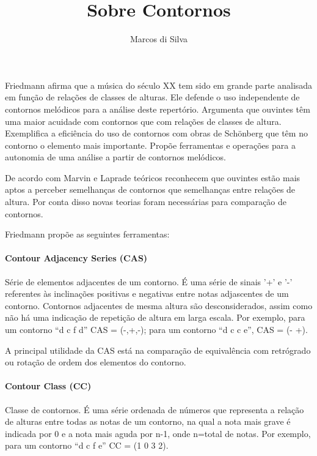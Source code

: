 \documentclass{article}
\title{Sobre Contornos}
\author{Marcos di Silva}
\begin{document}
\setlength{\parindent}{0cm}
\maketitle
\thispagestyle{empty}

Friedmann \cite{friedmann85:_method_discus_contour} afirma que a
música do século XX tem sido em grande parte analisada em função de
relações de classes de alturas. Ele defende o uso independente de
contornos melódicos para a análise deste repertório. Argumenta que
ouvintes têm uma maior acuidade com contornos que com relações de
classes de altura. Exemplifica a eficiência do uso de contornos com
obras de Schönberg que têm no contorno o elemento mais
importante. Propõe ferramentas e operações para a autonomia de uma
análise a partir de contornos melódicos.

De acordo com Marvin e Laprade \cite{marvin87:_relat_music_contour}
teóricos reconhecem que ouvintes estão mais aptos a perceber
semelhanças de contornos que semelhanças entre relações de altura. Por
conta disso novas teorias foram necessárias para comparação de
contornos.

Friedmann \cite{friedmann85:_method_discus_contour} propõe as seguintes
ferramentas:

\paragraph{Contour Adjacency Series (CAS)}
\label{sec:cont-adjac-seri}

Série de elementos adjacentes de um contorno. É uma série de sinais
'+' e '-' referentes às inclinações positivas e negativas entre notas
adjascentes de um contorno. Contornos adjacentes de mesma altura são
desconsiderados, assim como não há uma indicação de repetição de
altura em larga escala. Por exemplo, para um contorno ``d c f d'' CAS
= (-,+,-); para um contorno ``d c c e'', CAS = (- +).

A principal utilidade da CAS está na comparação de equivalência com
retrógrado ou rotação de ordem dos elementos do contorno.

\paragraph{Contour Class (CC)}
\label{sec:contour-class-cc}

Classe de contornos. É uma série ordenada de números que representa a
relação de alturas entre todas as notas de um contorno, na qual a nota
mais grave é indicada por 0 e a nota mais aguda por n-1, onde n=total
de notas. Por exemplo, para um contorno ``d c f e'' CC = (1 0 3 2).
\end{document}
